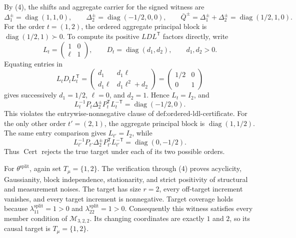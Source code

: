By (4), the shifts and aggregate carrier for the signed witness are
\[
 \Delta^{\pm}_1=\operatorname{diag}(1,1,0),\qquad
 \Delta^{\pm}_2=\operatorname{diag}(-1/2,0,0),\qquad
 \bar Q^{\pm}=\Delta^{\pm}_1+\Delta^{\pm}_2
 =\operatorname{diag}(1/2,1,0). \tag{6}
\]
For the order \(t=(1,2)\), the ordered aggregate principal block is \(\operatorname{diag}(1/2,1)\succ0\).  To compute its positive \(LDL^{\mathsf T}\) factors directly, write
\[
 L_t=\begin{pmatrix}1&0\\ \ell&1\end{pmatrix},\qquad
 D_t=\operatorname{diag}(d_1,d_2),\qquad d_1,d_2>0.
\]
Equating entries in
\[
 L_tD_tL_t^{\mathsf T}
 =\begin{pmatrix}d_1&d_1\ell\\d_1\ell&d_1\ell^2+d_2\end{pmatrix}
 =\begin{pmatrix}1/2&0\\0&1\end{pmatrix}
\]
gives successively \(d_1=1/2\), \(\ell=0\), and \(d_2=1\).  Hence \(L_t=I_2\), and
\[
 L_t^{-1}P_t\Delta^{\pm}_2P_t^{\mathsf T}L_t^{-\mathsf T}
 =\operatorname{diag}(-1/2,0). \tag{7}
\]
This violates the entrywise-nonnegative clause of \(\text{def:ordered-ldl-certificate}\).  For the only other order \(t'=(2,1)\), the aggregate principal block is \(\operatorname{diag}(1,1/2)\).  The same entry comparison gives \(L_{t'}=I_2\), while
\[
 L_{t'}^{-1}P_{t'}\Delta^{\pm}_2P_{t'}^{\mathsf T}L_{t'}^{-\mathsf T}
 =\operatorname{diag}(0,-1/2). \tag{8}
\]
Thus \(\operatorname{Cert}\) rejects the true target under each of its two possible orders.

For \(\theta^{\mathrm{split}}\), again set \(T_\mu=\{1,2\}\).  The verification through (4) proves acyclicity, Gaussianity, block independence, stationarity, and strict positivity of structural and measurement noises.  The target has size \(r=2\), every off-target increment vanishes, and every target increment is nonnegative.  Target coverage holds because \(\lambda^{\mathrm{split}}_{11}=1>0\) and \(\lambda^{\mathrm{split}}_{22}=1>0\).  Consequently this witness satisfies every member condition of \(\mathcal M_{3,2,2}\).  Its changing coordinates are exactly \(1\) and \(2\), so its causal target is \(T_\mu=\{1,2\}\).

